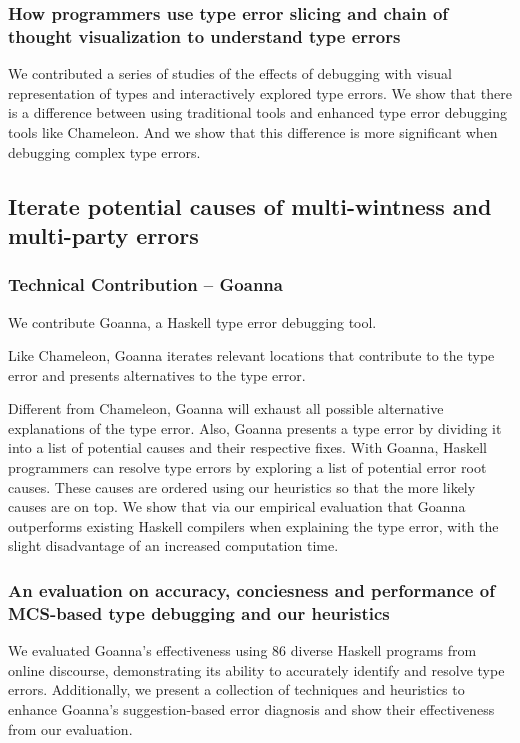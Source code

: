 \subsubsection{How programmers use type error slicing and chain of thought visualization to understand type errors}
We  contributed a series of studies of the effects of debugging with visual representation of types and interactively explored type errors. We show that there is a difference between using traditional tools and enhanced type error debugging tools like Chameleon. And we show that this difference is more significant when debugging complex type errors.

\subsection{Iterate potential causes of multi-wintness and multi-party errors}

\subsubsection{Technical Contribution -- Goanna}

We contribute Goanna, a Haskell type error debugging tool. 

Like Chameleon, Goanna iterates relevant locations that contribute to the type error and presents alternatives to the type error. 

Different from Chameleon, Goanna will exhaust all possible alternative explanations of the type error. Also, Goanna presents a type error by dividing it into a list of potential causes and their respective fixes. With Goanna, Haskell programmers can resolve type errors by exploring a list of potential error root causes. These causes are ordered using our heuristics so that the more likely causes are on top. We show that via our empirical evaluation that Goanna outperforms existing Haskell compilers when explaining the type error, with the slight disadvantage of an increased computation time.

\subsubsection{An evaluation on accuracy, conciesness and performance of MCS-based type debugging and our heuristics}

We evaluated Goanna's effectiveness using 86 diverse Haskell programs from online discourse, demonstrating its ability to accurately identify and resolve type errors. Additionally, we present a collection of techniques and heuristics to enhance Goanna's suggestion-based error diagnosis and show their effectiveness from our evaluation.


